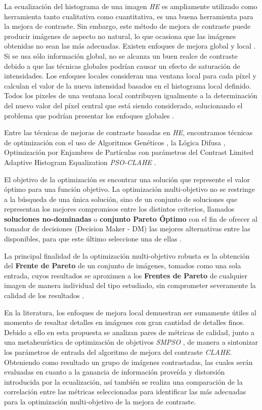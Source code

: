 La ecualización del histograma de una imagen \textit{HE} \cite{PTS+13} es ampliamente utilizado como herramienta tanto cualitativa como cuantitativa, es una buena herramienta para la mejora de contraste. Sin embargo, este método de mejora de contraste puede producir imágenes de aspecto no natural, lo que ocasiona que las imágenes obtenidas no sean las más adecuadas. Existen enfoques de mejora global y local \cite{morebrizuela2014}. Si se usa sólo información global, no se alcanza un buen realce de contraste debido a que las técnicas globales podrían causar un efecto de saturación de intensidades. Los enfoques locales consideran una ventana local para cada píxel y calculan el valor de la nueva intensidad basados en el histograma local definido. Todos los pixeles de una ventana local contribuyen igualmente a la determinación del nuevo valor del píxel central que está siendo considerado, solucionando el problema que podrían presentar los enfoques globales \cite{yu2004fast}. 

Entre las técnicas de mejoras de contraste basadas en \textit{HE}, encontramos técnicas de optimización con el uso de Algoritmos Genéticos \cite{hashemi2010image}, la Lógica Difusa \cite{jenifer2016contrast}, Optimización por Enjambres de Partículas con parámetros del Contrast Limited Adaptive Histogram Equalization \textit{PSO-CLAHE} \cite{morebrizuela2014}.

El objetivo de la optimización es encontrar una solución que represente el valor óptimo para una función objetivo. La optimización multi-objetivo no se restringe a la búsqueda de una única solución, sino de un conjunto de soluciones que representan los mejores compromisos entre los distintos criterios, llamados \textbf{soluciones no-dominadas} o \textbf{conjunto Pareto Óptimo} con el fin de ofrecer al tomador de decisiones (Decision Maker - DM) las mejores alternativas entre las disponibles, para que este último seleccione una de ellas \cite{coello2001short}.

La principal finalidad de la optimización multi-objetivo robusta es la obtención del \textbf{Frente de Pareto} de un conjunto de imágenes, tomados como una sola entrada, cuyos resultados se aproximen a los \textbf{Frentes de Pareto} de cualquier imagen de manera individual del tipo estudiado, sin comprometer severamente la calidad de los resultados \cite{Deb2006IntroducingRI}.

En la literatura, los enfoques de mejora local demuestran ser sumamente útiles al momento de resaltar detalles en imágenes con gran cantidad de detalles finos. Debido a ello en esta propuesta se analizan pares de métricas de calidad, junto a una metaheurística de optimización de objetivos \textit{SMPSO} \cite{RC05}, de manera a sintonizar los parámetros de entrada del algoritmo de mejora del contraste \textit{CLAHE}. Obteniendo como resultado un grupo de imágenes contrastadas, las cuales serán evaluadas en cuanto a la ganancia de información proveída y distorsión introducida por la ecualización, así también se realiza una comparación de la correlación entre las métricas seleccionadas para identificar las más adecuadas para la optimización multi-objetivo de la mejora de contraste.


